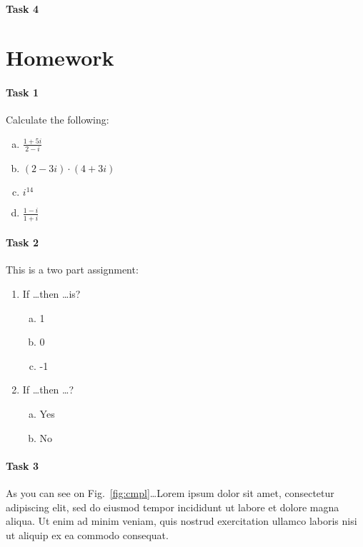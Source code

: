 \documentclass[a4paper,11pt]{article}
\theoremstyle{mytheor}
\begin{document}
\paragraph{Task 4}


\clearpage

\section{Homework}

\paragraph{Task 1}
Calculate the following:
\begin{multicols}{2}
\begin{enumerate}[(a)]
\item $\frac{1+5i}{2-i}$
\item $(2-3i)\cdot(4+3i)$
\item $i^{14}$
\item $\frac{1-i}{1+i}$
\end{enumerate}
\end{multicols}

\paragraph{Task 2}
This is a two part assignment:
\begin{enumerate}
\item If \ldots then \ldots is?
\begin{multicols}{3}
\begin{enumerate}[(a)]
\item 1
\item 0
\item -1
\end{enumerate}
\end{multicols}
\item If \ldots then \ldots ?
\begin{multicols}{2}
\begin{enumerate}[(a)]
\item Yes
\item No
\end{enumerate}
\end{multicols}
\end{enumerate}

\paragraph{Task 3}
As you can see on Fig.~\ref{fig:cmpl}\ldots Lorem ipsum dolor sit amet, consectetur adipiscing elit, sed do eiusmod tempor incididunt ut labore et dolore magna aliqua. Ut enim ad minim veniam, quis nostrud exercitation ullamco laboris nisi ut aliquip ex ea commodo consequat.
\end{document}
